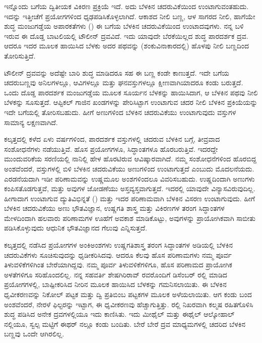 ಇನ್ನೊಂದು ಬಗೆಯ ದ್ವಿತೀಯಕ ವಿಕಿರಣ ಪ್ರಕ್ರಿಯೆ ಇದೆ. ಅದು ಬೆಳಕಿನ ಚದರುವಿಕೆಯಿಂದ ಉಂಟಾಗುವಂತಹುದು. ಇದನ್ನು ಇತ್ತೀಚೆಗೆ ಪ್ರಯೋಗಗಳಿಂದ ಧೃಢಪಡಿಸಿಕೊಳ್ಳಲಾಗಿದೆ. ಆಕಾಶದ ನೀಲಿ ಬಣ್ಣ, ಆಳ ಸಾಗರದ ನೀಲಿ, ಹಾಗೆಯೇ ಶುದ್ಧ ಮಂಜುಗಡ್ಡೆಯ ಅಪಾರಕತೆಗಳು () ಈ ಬಗೆಯ ಬೆಳಕಿನ ಚದರುವಿಕೆಯಿಂದ ಉಂಟಾದವುಗಳು. ನನ್ನ ಬಳಿ ಇರುವ ಈ ದೊಡ್ಡ ಬಾಟಲಿಯಲ್ಲಿ ಟೌಲೀನ್ ದ್ರವವಿದೆ. ಇದು ಯಾವುದೇ ಬೆರಕೆಯಿಲ್ಲದ ಶುದ್ಧ ಪಾರದರ್ಶಕ ದ್ರವ. ಆದರೂ ಇದರ ಮೂಲಕ ಹಾಯಿಸಿದ ಬೆಳಕು ಅದರ ಪಥವನ್ನು (ಶಂಕುವಿನಾಕಾರದಲ್ಲಿ) ಹೊಳಪು ನೀಲಿ ಬಣ್ಣದಿಂದ ತೋರಿಸುತ್ತಿದೆ.

ಟೌಲೀನ್ ದ್ರವವನ್ನು ಅದೆಷ್ಟೇ ಬಾರಿ ಶುದ್ಧ ಮಾಡಿದರೂ ಸಹ ಈ ಬಣ್ಣ ಕಂಡೇ ಕಾಣುತ್ತದೆ. ಇದೇ ಬಗೆಯ ಚದರುಬಣ್ಣವು ಅನಿಲಗಳಲ್ಲೂ, ಆವಿಗಳಲ್ಲೂ ಮತ್ತು ಘನವಸ್ತುಗಳಲ್ಲೂ ಕ್ಷೀಣವಾಗಿಯಾದರೂ ಕಂಡು ಬರುತ್ತದೆ. ಒಂದು ದೊಡ್ಡ ಪಾರದರ್ಶಕ ಮಂಜುಗಡ್ಡೆಯ ಮೂಲಕ ಸೂರ್ಯನ ಬೆಳಕನ್ನು ಹಾಯಿಸಿದಾಗ, ಆ ಬೆಳಕಿನ ಪಥವು ನೀಲಿ ಬೆಳಕನ್ನು ಸೂಸುತ್ತದೆ. ಆಪ್ಟಿಕಲ್ ಗಾಜಿನ ಖಂಡಗಳನ್ನು ಪೇರಿಸಿಟ್ಟಾಗ ಉಂಟಾಗುವ ಚದರ ನೀಲಿ ಬೆಳಕಿನ ಪ್ರಕಿಯೆಯನ್ನು ಇದೇ ಬಗೆಯಲ್ಲಿ ತೋರಿಸಬಹುದು. ಹೀಗೆ ಅಣುಗಳಿಂದ ಬೆಳಕಿನ ಚದರುವಿಕೆಯು ಉಂಟಾಗುವುದು ವಸ್ತುಗಳ ಸಾಮಾನ್ಯ ಲಕ್ಷಣವಾಗಿದೆ.

ಕಲ್ಕತ್ತದಲ್ಲಿ ಕಳೆದ ಏಳು ವರ್ಷಗಳಿಂದ, ಪಾರದರ್ಶಕ ವಸ್ತುಗಳಲ್ಲಿ ಚದರುವ ಬೆಳಕಿನ ಬಗ್ಗೆ, ತೀವ್ರವಾದ ಸಂಶೋಧನೆಗಳು ನಡೆಯುತ್ತಿವೆ. ಹೊಸ ಪ್ರಯೋಗಗಳೂ, ಸಿದ್ಧಾಂತಗಳೂ ಹೊರಬರುತ್ತಿವೆ. ಇದರದ್ದೇ ಮುಂದುವರಿಕೆಯ ಸರಣಿಯಲ್ಲಿ ನಾನಿಲ್ಲಿ ಹೇಳ ಹೊರಟಿರುವ ಆವಿಷ್ಕಾರವಾಗಿದೆ. ನಮ್ಮ ಸಂಶೋಧನೆಗಳಿಂದ ಹೊರಬಿದ್ದ ಅಂಶವೆಂದರೆ, ವಸ್ತುಗಳಲ್ಲಿ ಬಿಳಿ ಬೆಳಕಿನ ಚದರುವಿಕೆಯು ಅಣುಗಳಿಂದ ಉಂಟಾಗುತ್ತದೆ ಎಂಬುದು ಮೊದಲನೆಯದು. ಎರಡನೆಯದಾಗಿ ಇಡೀ ಪರಿಣಾಮವನ್ನು ಉಷ್ಣಮೂಲ ಅಂಶಗಳಿಂದಲೂ ವಿವರಿಸಬಹುದು. ಉಷ್ಣದಿಂದಾಗಿ ಅಣುಗಳು ಕಂಪಿಸತೊಡಗುತ್ತವೆ, ಮತ್ತು ಅವುಗಳ ಜೋಡಣೆಯು ಅಸ್ತವ್ಯಸ್ತವಾಗುತ್ತದೆ. ಇದರಲ್ಲಿ ಯಾವುದೇ ವಿನ್ಯಾಸವಿರುವುದಿಲ್ಲ. ಹೀಗಾದಾಗ ಉಂಟಾಗುವ ದ್ಯುತಿವಿಭಿನ್ನತೆ () ಮತ್ತು ಇದರ ಪರಿಣಾಮವಾಗಿ ಬೆಳಕಿನ ವಿಸರಣ ಉಂಟಾಗುವುದು. ಹೀಗೆ ಬೆಳಕಿನ ಚದರುವಿಕೆಯು ಅಣು ಭೌತವಿಜ್ಞಾನ, ಉಷ್ಣಗತಿ ಶಾಸ್ತ್ರ ಮತ್ತು ವಿಕಿರಣಗಳ ತರಂಗ ಸಿದ್ಧಾಂತಗಳ ಮೇಳದಿಂದಾಗಿ ಹಲವಾರು ಪರಿಣಾಮಗಳ ಊಹೆಗೆ ಅವಕಾಶ ಮಾಡಿಕೊಟ್ಟು, ಅವುಗಳನ್ನು ಪ್ರಾಯೋಗಿಕವಾಗಿ ಸಾಬೀತು ಪಡಿಸಿಕೊಳ್ಳುವುದು ಆಧುನಿಕ ಭೌತವಿಜ್ಞಾನದ ಗೆಲುವು ಎನ್ನಿಸುತ್ತದೆ.



ಕಲ್ಕತ್ತದಲ್ಲಿ ನಡೆಸಿದ ಪ್ರಯೋಗಗಳ ಅಂಕಿಅಂಶಗಳು ಉಷ್ಣಗತಿಶಾಸ್ತ್ರ ತರಂಗ ಸಿದ್ಧಾಂತಗಳ ಅಡಿಯಲ್ಲಿ ಬೆಳಕಿನ ಚದರುವಿಕೆಗಳು ಸೂಚಿಸುವುದನ್ನು ಧೃಡೀಕರಿಸಿದವು. ಆದರೂ ಕೆಲವು ಹೊಸ ಪರಿಣಾಮಗಳು ನಮ್ಮ ಪೂರ್ವ ತಿಳುವಳಿಕೆಗಳಿಗಿಂತ ಬೇರೆಯಾಗಿದ್ದವು. ನಮ್ಮ ಪೂರ್ವ ತಿಳುವಳಿಕೆಗಳಿಗೂ, ಹೊಸ ಪರಿಣಾಮದ ಪ್ರಾಯೋಗಿಕ ಅಳತೆಗಳಿಗೂ ಸರಿಹೊಂದಲಿಲ್ಲ. ನನ್ನ ಸಹವರ್ತಿ ಶೇಷಗಿರಿರಾವ್ ರವರೊಂದಿಗೆ ಡಿಸೆಂಬರ್ ರಲ್ಲಿ ಮಾಡಿದ ಪ್ರಯೋಗಗಳಲ್ಲಿ, ಬಾಷ್ಪೀಕರಿಸಿದ ನೀರಿನ ಮೂಲಕ ಹಾಯಿಸಿದ ಬೆಳಕನ್ನು ಗಮನಿಸಲಾಯಿತು. ಈ ಬೆಳಕಿನ ಧೃವೀಕರಣವನ್ನು ನಿಕೋಲ್ ಪಟ್ಟಕ ಮತ್ತು ದ್ವಿ ಪ್ರತಿಬಿಂಬ ಪಟ್ಟಕಗಳ ಮೂಲಕ ಅಳೆಯಲಾಯಿತು. ಆಗ ಕಂಡು ಬಂದ ಅಂಶವೆಂದರೆ, ನೇರಳೆ ಫಿಲ್ಟರನ್ನು ಇಟ್ಟಾಗ, ಈ ಧೃವೀಕರಣವು ಹೆಚ್ಚಾಗುತ್ತಿತ್ತು. ರಲ್ಲಿ ನಿಖರವಾಗಿ ಕಲ್ಮಷ ರಹಿತಗೊಳಿಸಿ ಶುದ್ಧ ಪಡಿಸಿದ ಅನೇಕ ದ್ರವಗಳಲ್ಲಿಯೂ ಇದು ಕಾಣಿಸಿತು. ಇದು ಮೀಥೈಲ್ ಮತ್ತು ಈಥೈಲ್ ಆಲ್ಕೋಹಾಲ್ ನಲ್ಲಿಯೂ, ಸ್ವಲ್ಪ ಮಟ್ಟಿಗೆ ಈಥರ್ ನಲ್ಲೂ ಕಂಡು ಬಂದಿತು. ಬೇರೆ ಬೇರೆ ದ್ರವ ಮಾಧ್ಯಮಗಳಲ್ಲಿ ಚದರಿದ ಬೆಳಕಿನ ಬಣ್ಣವು ಒಂದೇ ಆಗಿರಲಿಲ್ಲ.

